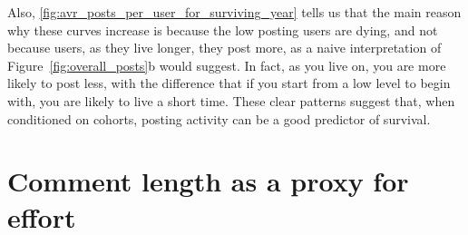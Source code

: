 Also, \ref{fig:avr_posts_per_user_for_surviving_year} tells us that the main reason why these curves increase is because the low posting users are dying, and not because users, as they live longer, they post more, as a naive interpretation of Figure~\ref{fig:overall_posts}b would suggest. In fact, as you live on, you are more likely to post less, with the difference that if you start from a low level to begin with, you are likely to live a short time. These clear patterns suggest that, when conditioned on cohorts, posting activity can be a good predictor of survival.





\section{Comment length as a proxy for effort}

